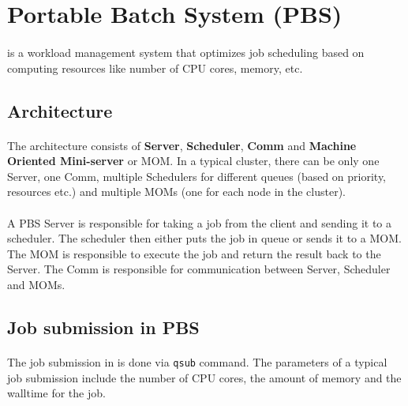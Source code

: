 
\section{Portable Batch System (PBS)}

\paragraph{}  is a workload management system that optimizes
\gls{job} scheduling based on computing resources like number of CPU cores,
memory, etc.


\subsection{Architecture}

\paragraph{} The  architecture consists of \textbf{Server},
\textbf{Scheduler}, \textbf{Comm} and \textbf{Machine Oriented Mini-server} or
MOM. In a typical  cluster, there can be only one Server, one
Comm, multiple Schedulers for different queues (based on priority, resources
etc.) and multiple MOMs (one for each node in the cluster).

\paragraph{} A PBS Server is responsible for taking a job from the client and
sending it to a scheduler. The scheduler then either puts the job in queue or
sends it to a MOM. The MOM is responsible to execute the job and return the
result back to the Server. The Comm is responsible for communication between
Server, Scheduler and MOMs.


\subsection{Job submission in PBS}

\paragraph{} The job submission in  is done via \texttt{qsub}
command. The parameters of a typical job submission include the number of CPU
cores, the amount of memory and the \gls{walltime} for the job.

